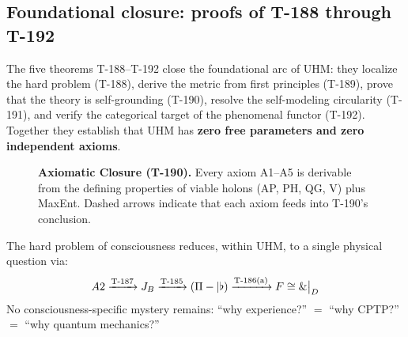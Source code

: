 \subsection{Foundational closure: proofs of T-188 through T-192}
\label{subsec:foundational-closure}

The five theorems T-188--T-192 close the foundational arc of UHM: they
localize the hard problem (T-188), derive the metric from first principles
(T-189), prove that the theory is self-grounding (T-190), resolve the
self-modeling circularity (T-191), and verify the categorical target of
the phenomenal functor (T-192). Together they establish that UHM has
\textbf{zero free parameters and zero independent axioms}.

\begin{figure}[H]
\centering
{}
\caption{\textbf{Axiomatic Closure (T-190).} Every axiom A1--A5 is derivable
from the defining properties of viable holons (AP, PH, QG, V) plus MaxEnt.
Dashed arrows indicate that each axiom feeds into T-190's conclusion.}
\label{fig:axiomatic-closure}
\end{figure}

\begin{theorembox}
\label{thm:t188-localization}
The hard problem of consciousness reduces, within UHM, to a single physical
question via:
\begin{equation}
  A2 \xrightarrow{\text{T-187}} J_B
  \xrightarrow{\text{T-185}} (\Pi -| \flat)
  \xrightarrow{\text{T-186(a)}} F \cong \&\big|_{D}
  \label{eq:localization-chain}
\end{equation}
No consciousness-specific mystery remains: ``why experience?'' $=$ ``why CPTP?''
$=$ ``why quantum mechanics?''
\end{theorembox}

